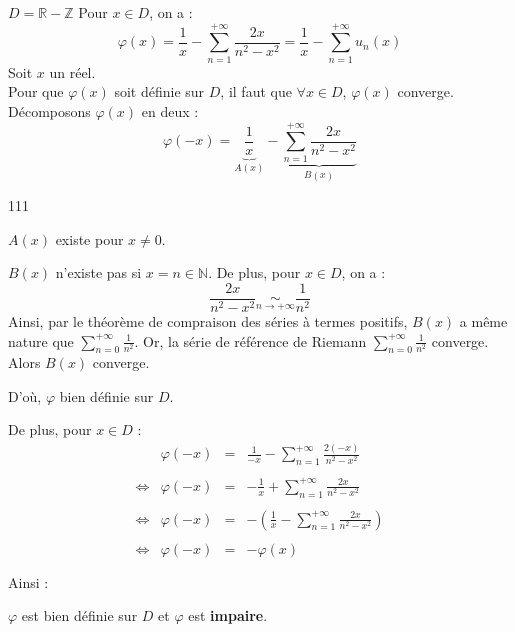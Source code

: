 $D = \mathbb{R} - \mathbb{Z}$ Pour $x \in D$, on a :
\[
  \varphi(x) = \frac{1}{x} - \sum_{n=1}^{+\infty} \frac{2x}{n^2-x^2} =  \frac{1}{x} - \sum_{n=1}^{+\infty} u_n(x)
\]
Soit $x$ un réel.\\
Pour que $\varphi(x)$ soit définie sur $D$, il faut que $\forall x \in D$, $\varphi(x)$ converge. Décomposons $\varphi(x)$ en deux : \\
\[
  \varphi(-x) = \underbrace{\frac{1}{x}}_{A(x)} - \underbrace{\sum\limits_{n=1}^{+\infty} \frac{2x}{n^2-x^2}}_{B(x)}
\]
\begin{dinglist}{111}
  \item $A(x)$ existe pour $x\neq 0$.
  \item $B(x)$ n'existe pas si $x = n\in\mathbb{N}$. De plus, pour $x\in D$, on a :
  \[\frac{2x}{n^2-x^2}\underset{n\rightarrow+\infty}{\sim}\frac{1}{n^2}\]
  Ainsi, par le théorème de compraison des séries à termes positifs, $B(x)$ a même nature que $\sum\limits_{n=0}^{+\infty} \frac{1}{n^2}$.
  Or, la série de référence de Riemann $\sum\limits_{n=0}^{+\infty} \frac{1}{n^2}$ converge. Alors $B(x)$ converge.
\end{dinglist}
D'où, $\varphi$ bien définie sur $D$.

De plus, pour $x \in D$ :
\[
  \begin{array}{crcl}
         & \varphi(-x) & = & \frac{1}{-x} - \sum\limits_{n=1}^{+\infty} \frac{2(-x)}{n^2-x^2}           \\\\
    \iff & \varphi(-x) & = & -\frac{1}{x} + \sum\limits_{n=1}^{+\infty} \frac{2x}{n^2-x^2}              \\\\
    \iff & \varphi(-x) & = & -\left(\frac{1}{x} - \sum\limits_{n=1}^{+\infty} \frac{2x}{n^2-x^2}\right) \\\\
    \iff & \varphi(-x) & = & -\varphi(x)                                                                \\\\
  \end{array}
\]
Ainsi :
\begin{result}
  $\varphi$ est bien définie sur $D$ et $\varphi$ est \textbf{impaire}.
\end{result}
